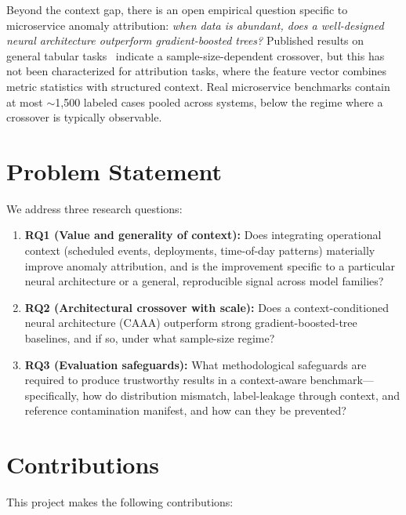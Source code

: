 \documentclass[12pt,a4paper]{report}
\newcommand{\sys}{CAAA}
\begin{document}
Beyond the context gap, there is an open empirical question specific to microservice anomaly attribution: \emph{when data is abundant, does a well-designed neural architecture outperform gradient-boosted trees?} Published results on general tabular tasks~\cite{grinsztajn2022tree,mcelfresh2023neural} indicate a sample-size-dependent crossover, but this has not been characterized for attribution tasks, where the feature vector combines metric statistics with structured context. Real microservice benchmarks contain at most $\sim$1{,}500 labeled cases pooled across systems, below the regime where a crossover is typically observable.

\section{Problem Statement}

We address three research questions:

\begin{enumerate}
    \item \textbf{RQ1 (Value and generality of context):} Does integrating operational context (scheduled events, deployments, time-of-day patterns) materially improve anomaly attribution, and is the improvement specific to a particular neural architecture or a general, reproducible signal across model families?
    \item \textbf{RQ2 (Architectural crossover with scale):} Does a context-conditioned neural architecture (\sys{}) outperform strong gradient-boosted-tree baselines, and if so, under what sample-size regime?
    \item \textbf{RQ3 (Evaluation safeguards):} What methodological safeguards are required to produce trustworthy results in a context-aware benchmark---specifically, how do distribution mismatch, label-leakage through context, and reference contamination manifest, and how can they be prevented?
\end{enumerate}

\section{Contributions}

This project makes the following contributions:
\end{document}
